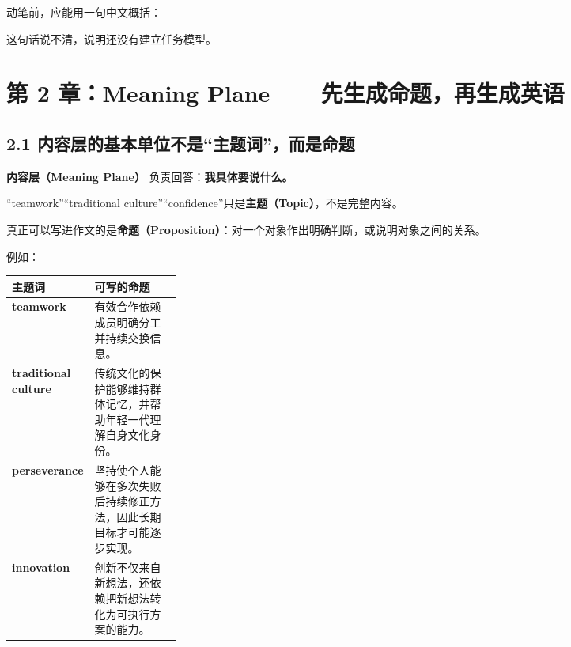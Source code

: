 \documentclass[11pt,a4paper]{ctexart}
\newcommand{\kw}[1]{\textbf{#1}}
\newcommand{\term}[2]{\textbf{#1（#2）}}
\begin{document}
\begin{exam}[任务层的最低完成标准]
动笔前，应能用一句中文概括：
\begin{center}
\end{center}
这句话说不清，说明还没有建立任务模型。
\end{exam}

\newpage
\section{第 2 章：Meaning Plane——先生成命题，再生成英语}

\subsection{2.1 内容层的基本单位不是“主题词”，而是命题}
\term{内容层}{Meaning Plane} 负责回答：\kw{我具体要说什么。}

“teamwork”“traditional culture”“confidence”只是\term{主题}{Topic}，不是完整内容。

真正可以写进作文的是\term{命题}{Proposition}：对一个对象作出明确判断，或说明对象之间的关系。

例如：
\begin{center}
\small
\begin{tabularx}{0.94\linewidth}{>{\bfseries}p{0.25\linewidth} X}
\toprule
主题词 & 可写的命题 \\
\midrule
teamwork & 有效合作依赖成员明确分工并持续交换信息。 \\
traditional culture & 传统文化的保护能够维持群体记忆，并帮助年轻一代理解自身文化身份。 \\
perseverance & 坚持使个人能够在多次失败后持续修正方法，因此长期目标才可能逐步实现。 \\
innovation & 创新不仅来自新想法，还依赖把新想法转化为可执行方案的能力。 \\
\bottomrule
\end{tabularx}
\end{center}
\end{document}

